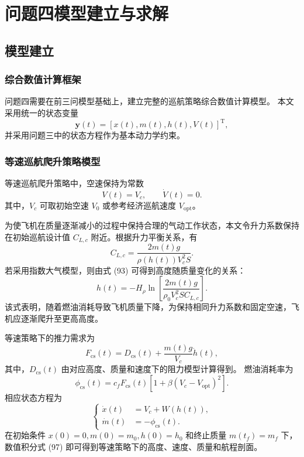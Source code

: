 \documentclass[withoutpreface,bwprint]{cumcmthesis} %
\begin{document}
\section{问题四模型建立与求解}
\subsection{模型建立}
\subsubsection{综合数值计算框架}
问题四需要在前三问模型基础上，建立完整的巡航策略综合数值计算模型。
本文采用统一的状态变量
\[
    \boldsymbol y(t)=\left[x(t),m(t),h(t),V(t)\right]^{\mathrm T},
\]
并采用问题三中的状态方程作为基本动力学约束。\

\subsubsection{等速巡航爬升策略模型}

等速巡航爬升策略中，空速保持为常数
\begin{equation}
    V(t)=V_c,
    \qquad
    \dot V(t)=0.
    \label{eq:q4_const_speed}
\end{equation}
其中，$V_c$ 可取初始空速 $V_0$ 或参考经济巡航速度 $V_{\mathrm{opt}}$。

为使飞机在质量逐渐减小的过程中保持合理的气动工作状态，本文令升力系数保持在初始巡航设计值
$C_{L,c}$ 附近。根据升力平衡关系，有
\begin{equation}
    C_{L,c}
    =
    \frac{2m(t)g}{\rho(h(t))V_c^2S}.
    \label{eq:q4_CL_const}
\end{equation}
若采用指数大气模型，则由式 (93) 可得到高度随质量变化的关系：
\begin{equation}
    h(t)
    =
    -H_\rho
    \ln
    \left[
    \frac{2m(t)g}{\rho_0V_c^2SC_{L,c}}
    \right].
    \label{eq:q4_h_m_const_speed}
\end{equation}
该式表明，随着燃油消耗导致飞机质量下降，为保持相同升力系数和固定空速，飞机应逐渐爬升至更高高度。

等速策略下的推力需求为
\begin{equation}
    F_{\mathrm{cs}}(t)
    =
    D_{\mathrm{cs}}(t)
    +
    \frac{m(t)g}{V_c}\dot h(t),
    \label{eq:q4_F_const_speed}
\end{equation}
其中，$D_{\mathrm{cs}}(t)$ 由对应高度、质量和速度下的阻力模型计算得到。
燃油消耗率为
\begin{equation}
    \phi_{\mathrm{cs}}(t)
    =
    c_fF_{\mathrm{cs}}(t)
    \left[
    1+\beta\left(V_c-V_{\mathrm{opt}}\right)^2
    \right].
    \label{eq:q4_phi_const_speed}
\end{equation}
相应状态方程为
\begin{equation}
\left\{
\begin{aligned}
    \dot x(t)&=V_c+W(h(t)),\\
    \dot m(t)&=-\phi_{\mathrm{cs}}(t).
\end{aligned}
\right.
\label{eq:q4_cs_ode}
\end{equation}
在初始条件 $x(0)=0,m(0)=m_0,h(0)=h_0$ 和终止质量 $m(t_f)=m_f$ 下，
数值积分式 (97) 即可得到等速策略下的高度、速度、质量和航程剖面。
\end{document}
